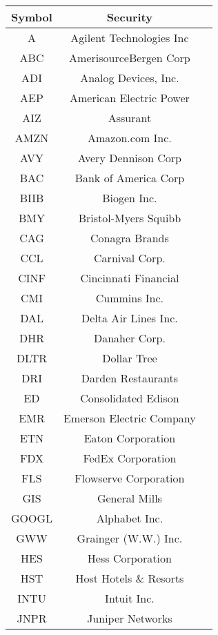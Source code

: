 \documentclass[11pt]{article}
\begin{document}
\begin{onehalfspace}
\begin{longtable}[h!]{|c|c|c|}
            \hline
            \textbf{Symbol} & \textbf{Security}  \\
            \hline \hline
            A & Agilent Technologies Inc \\ \hline
        ABC & AmerisourceBergen Corp \\ \hline
        ADI & Analog Devices, Inc. \\ \hline
        AEP & American Electric Power \\ \hline
        AIZ & Assurant \\ \hline
        AMZN & Amazon.com Inc. \\ \hline
        AVY & Avery Dennison Corp \\ \hline
        BAC & Bank of America Corp \\ \hline
        BIIB & Biogen Inc. \\ \hline
        BMY & Bristol-Myers Squibb \\ \hline
        CAG & Conagra Brands \\ \hline
        CCL & Carnival Corp. \\ \hline
        CINF & Cincinnati Financial \\ \hline
        CMI & Cummins Inc. \\ \hline
        DAL & Delta Air Lines Inc.  \\ \hline
        DHR & Danaher Corp. \\ \hline
        DLTR & Dollar Tree \\ \hline
        DRI & Darden Restaurants \\ \hline
        ED & Consolidated Edison \\ \hline
        EMR & Emerson Electric Company \\ \hline
        ETN & Eaton Corporation \\ \hline
        FDX & FedEx Corporation \\ \hline
        FLS & Flowserve Corporation \\ \hline
        GIS & General Mills \\ \hline
        GOOGL & Alphabet Inc. \\ \hline
        GWW & Grainger (W.W.) Inc. \\ \hline
        HES & Hess Corporation \\ \hline
        HST & Host Hotels \& Resorts \\ \hline
        INTU & Intuit Inc. \\ \hline
        JNPR & Juniper Networks \\ \hline

\end{longtable}
\end{onehalfspace}
\end{document}
